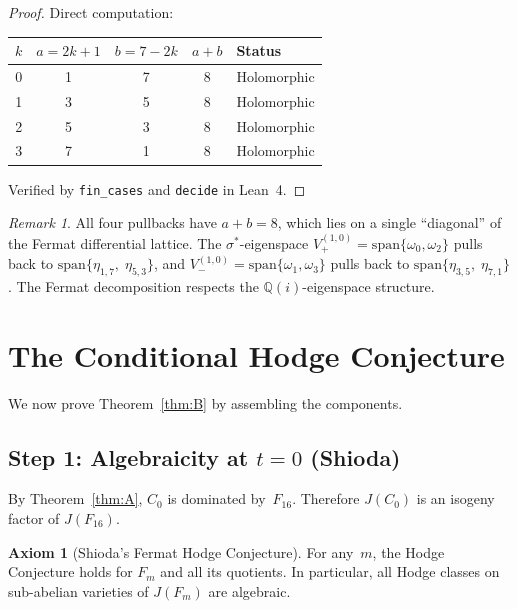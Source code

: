 \documentclass[11pt]{article}
\theoremstyle{plain}
\theoremstyle{definition}
\newtheorem{axiombox}[theorem]{Axiom}
\theoremstyle{remark}
\newtheorem{remark}[theorem]{Remark}
\newcommand{\Q}{\mathbb{Q}}
\begin{document}
\begin{proof}
Direct computation:
\begin{center}
\begin{tabular}{ccccl}
\toprule
$k$ & $a = 2k+1$ & $b = 7-2k$ & $a+b$ & Status \\
\midrule
0 & 1 & 7 & 8 & Holomorphic \\
1 & 3 & 5 & 8 & Holomorphic \\
2 & 5 & 3 & 8 & Holomorphic \\
3 & 7 & 1 & 8 & Holomorphic \\
\bottomrule
\end{tabular}
\end{center}
Verified by \texttt{fin\_cases} and \texttt{decide} in Lean~4.
\end{proof}

\begin{remark}\label{rmk:eigenspace}
All four pullbacks have $a + b = 8$, which lies on a single
``diagonal'' of the Fermat differential lattice.  The
$\sigma^*$-eigenspace $V_+^{(1,0)} = \mathrm{span}\{\omega_0,
\omega_2\}$ pulls back to $\mathrm{span}\{\eta_{1,7},\;
\eta_{5,3}\}$, and $V_-^{(1,0)} = \mathrm{span}\{\omega_1,
\omega_3\}$ pulls back to $\mathrm{span}\{\eta_{3,5},\;
\eta_{7,1}\}$.  The Fermat decomposition respects the
$\Q(i)$-eigenspace structure.
\end{remark}

\section{The Conditional Hodge Conjecture}
\label{sec:hodge}

We now prove Theorem~\ref{thm:B} by assembling the components.

\subsection{Step 1: Algebraicity at $t = 0$ (Shioda)}

By Theorem~\ref{thm:A}, $C_0$ is dominated by~$F_{16}$.
Therefore $J(C_0)$ is an isogeny factor of $J(F_{16})$.

\begin{axiombox}[Shioda's Fermat Hodge Conjecture]
\label{ax:shioda}
For any~$m$, the Hodge Conjecture holds for $F_m$ and all its
quotients.  In particular, all Hodge classes on sub-abelian
varieties of $J(F_m)$ are algebraic.
\end{axiombox}
\end{document}
